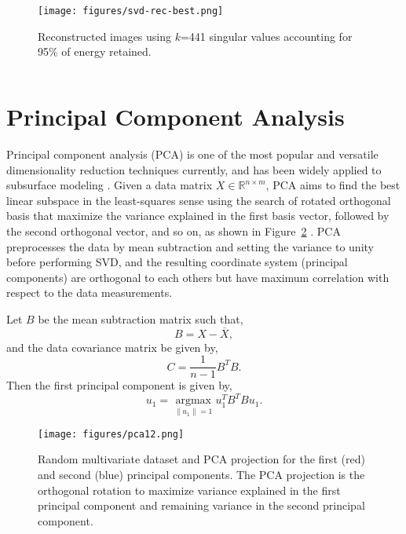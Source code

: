 \documentclass[a4paper,fleqn,12pt]{article}
\begin{document}
\begin{figure}[H]
    \centering
    \texttt{[image: figures/svd-rec-best.png]}
    \caption{Reconstructed images using $k$=441 singular values accounting for 95\% of energy retained.}
    \label{fig:svd-rec-best}
\end{figure}

\inputminted[frame=lines, framesep=2mm, baselinestretch=1.2, 
             bgcolor=LightGray, fontsize=\footnotesize, linenos]
{python}{codes/svd.py}

\pagebreak
\section*{Principal Component Analysis}

Principal component analysis (PCA) is one of the most popular and versatile dimensionality reduction techniques currently, and has been widely applied to subsurface modeling \cite{sarma2007new, vo2014new, pyrcz2024appliedml}. Given a data matrix $X\in\mathbb{R}^{n\times m}$, PCA aims to find the best linear subspace in the least-squares sense using the search of rotated orthogonal basis that maximize the variance explained in the first basis vector, followed by the second orthogonal vector, and so on, as shown in Figure~\ref{fig:pca12} \cite{jolliffe2016principal, abdi2010principal}. PCA preprocesses the data by mean subtraction and setting the variance to unity before performing SVD, and the resulting coordinate system (principal components) are orthogonal to each others but have maximum correlation with respect to the data measurements. 

Let $B$ be the mean subtraction matrix such that,
\begin{equation}
    B=X-\overline{X} ,
\end{equation}
and the data covariance matrix be given by,
\begin{equation}
    C=\frac{1}{n-1}B^TB .
\end{equation}
Then the first principal component is given by,
\begin{equation}
    u_1 = \operatorname*{argmax}_{\|u_1\|=1} u_1^TB^TBu_1 .
\end{equation}

\begin{figure}[H]
    \centering
    \texttt{[image: figures/pca12.png]}
    \caption{Random multivariate dataset and PCA projection for the first (red) and second (blue) principal components. The PCA projection is the orthogonal rotation to maximize variance explained in the first principal component and remaining variance in the second principal component.}
    \label{fig:pca12}
\end{figure}
\end{document}
